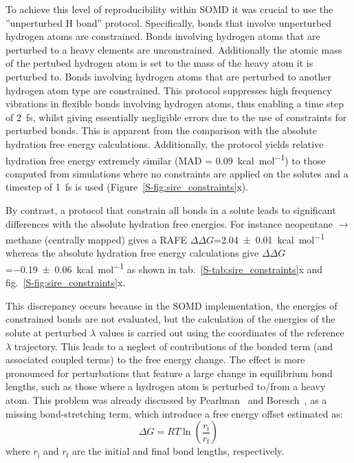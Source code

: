 \documentclass[journal=jctcce,manuscript=article]{achemso}
\begin{document}
To achieve this level of reproducibility within SOMD it was crucial to use the
''unperturbed H bond'' protocol. Specifically, bonds that involve unperturbed hydrogen 
atoms are constrained. Bonds involving hydrogen atoms that are perturbed to a heavy elements
are unconstrained.
Additionally the atomic mass of the pertubed hydrogen atom is set to the mass of 
the heavy atom it is perturbed to.
Bonds involving hydrogen atoms that are perturbed to another hydrogen atom type are 
constrained. This protocol suppresses high frequency vibrations in flexible bonds 
involving hydrogen atoms, thus enabling a time step of \SI{2}{fs}, whilst 
giving 
essentially negligible errors due to the use of constraints for perturbed bonds. 
This is apparent from the comparison with the absolute hydration free energy calculations. 
Additionally, the protocol yields relative hydration free energy extremely similar
(MAD = \SI{0.09}{kcal.mol^{-1}}) to those computed from simulations where no
constraints are applied on the solutes and a timestep of \SI{1}{fs} is
used (Figure~\ref{S-fig:sire_constraints}x).

By contrast, a protocol that constrain all bonds in a solute leads to significant
differences with the absolute hydration free energies. For instance 
neopentane $\rightarrow$ methane (centrally mapped) gives a RAFE
$\Delta\Delta G$=\SI{2.04 +- 0.01}{kcal.mol^{-1}}  whereas the absolute hydration free
energy calculations give $\Delta\Delta G$=\SI{-0.19+-0.06}{kcal.mol^{-1}} as shown in 
tab.~\ref{S-tab:sire_constraints}x and fig.~\ref{S-fig:sire_constraints}x.

This discrepancy occurs because in the SOMD implementation, the energies of 
constrained bonds are not evaluated, but the calculation of the energies of the 
solute at perturbed $\lambda$ values is carried out using the coordinates of 
the 
reference $\lambda$ trajectory. This leads to a neglect of contributions of the 
bonded
term (and associated coupled terms) to the free energy change. The effect 
is more pronounced for perturbations that feature a large change in 
equilibrium bond lengths, such as those where a hydrogen atom is perturbed to/from a heavy atom.
This problem was already discussed by Pearlman~\cite{pearlman1991overlooked} 
and Boresch~\cite{doi:10.1021/jp981628n, doi:10.1021/jp981629f}, as a missing 
bond-stretching term, which introduce a free energy offset estimated as:
\begin{equation}
 \label{eq:allbondserror}
 \Delta G= RT\ln \left ( \frac{r_{\mathrm{i}}}{r_\mathrm{f}} \right)  
\end{equation}
where $r_{\mathrm{i}}$ and $r_{\mathrm{f}}$ are the initial and final bond 
lengths, respectively. 
\end{document}
